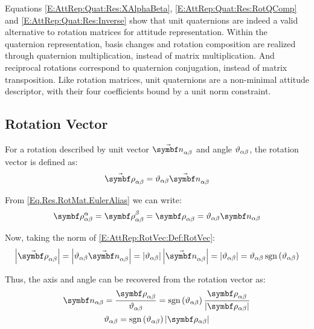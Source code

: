 Equations \eqref{E:AttRep:Quat:Res:XAlphaBeta}, \eqref{E:AttRep:Quat:Res:RotQComp} and \eqref{E:AttRep:Quat:Res:Inverse} show that unit quaternions are indeed a valid alternative to rotation matrices for attitude representation. Within the quaternion representation, basis changes and rotation composition are realized through quaternion multiplication, instead of matrix multiplication. And reciprocal rotations correspond to quaternion conjugation, instead of matrix transposition. Like rotation matrices, unit quaternions are a non-minimal attitude descriptor, with their four coefficients bound by a unit norm constraint.



\subsection{Rotation Vector} %

For a rotation described by unit vector $\varel{\rotax}{\alpha}{\beta}$ and angle $\vartheta_{\alpha \beta}$, the rotation vector is defined as:
\begin{equation} \label{E:AttRep:RotVec:Def:RotVec}
	\varel{\rotvecsymb}{\alpha}{\beta} = \rel{\rotang}{\alpha}{\beta} \varel{\rotax}{\alpha}{\beta}
\end{equation}

From \eqref{Eq.Res.RotMat.EulerAlias} we can write:
\begin{equation} \label{Eq.Res.RotVec.RhoAlphaBeta}
	\rotv[\alpha]{\alpha}{\beta} = \rotv[\beta]{\alpha}{\beta} = \rotv{\alpha}{\beta} = \rel{\rotang}{\alpha}{\beta} \vrel{\rotax}{\alpha}{\beta}
\end{equation}

Now, taking the norm of \eqref{E:AttRep:RotVec:Def:RotVec}:
\begin{equation}
	\norm{\varel{\rotvecsymb}{\alpha}{\beta}} = \norm{\rel{\rotang}{\alpha}{\beta} \varel{\rotax}{\alpha}{\beta}} = \norm{\rel{\rotang}{\alpha}{\beta}} \norm{\varel{\rotax}{\alpha}{\beta}} = \abs{\rel{\rotang}{\alpha}{\beta}} = \rel{\rotang}{\alpha}{\beta} \sign{\rel{\rotang}{\alpha}{\beta}}
\end{equation}

Thus, the axis and angle can be recovered from the rotation vector as:
\begin{subequations}
	\begin{gather}
		\vrel{\rotax}{\alpha}{\beta} = \frac{\rotv{\alpha}{\beta}}{\rel{\rotang}{\alpha}{\beta}} =  \sign{\rel{\rotang}{\alpha}{\beta}} \frac{\rotv{\alpha}{\beta}}{\normrotv{\alpha}{\beta}} \label{E:AttRep:RotVec:Res:RotV2AxPrev} \\
		\rel{\rotang}{\alpha}{\beta} = \sign{\rel{\rotang}{\alpha}{\beta}} \normrotv{\alpha}{\beta} \label{E:AttRep:RotVec:Res:RotV2AngPrev}
	\end{gather}
\end{subequations}

